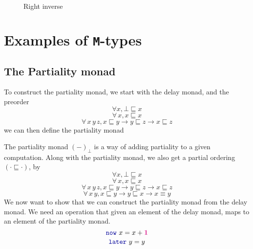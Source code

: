 \documentclass[twoside,11pt,openright]{report}
\theoremstyle{plain} %
\theoremstyle{definition}
\theoremstyle{remark}
\newcommand*{\type}[1]{\textcolor{magenta!90!black}{#1}}
\newcommand*{\unit}{\type{\textbf{1}}}
\newcommand*{\function}[1]{\textcolor{blue!60!black}{\ensuremath{\mathtt{#1}}}}
\begin{document}
\begin{figure}[h]
  \centering
  \caption{Right inverse}
  \label{fig:contractive}
\end{figure}


\chapter{Examples of \texttt{M}-types}

\section{The Partiality monad}
To construct the partiality monad, we start with the delay monad, and the preorder
\begin{equation}
\forall x, \bot \sqsubseteq x
\end{equation}
\begin{equation}
\forall\,x, x \sqsubseteq x
\end{equation}
\begin{equation}
\forall\,x\,y\,z, x \sqsubseteq y \rightarrow y \sqsubseteq z \rightarrow x \sqsubseteq z
\end{equation}
we can then define the partiality monad

The partiality monad \((-)_\bot\) is a way of adding partiality to a given computation. Along with the partiality monad, we also get a partial ordering \((\cdot \sqsubseteq \cdot)\), by
\begin{equation}
\forall x, \bot \sqsubseteq x
\end{equation}
\begin{equation}
\forall\,x, x \sqsubseteq x
\end{equation}
\begin{equation}
\forall\,x\,y\,z, x \sqsubseteq y \rightarrow y \sqsubseteq z \rightarrow x \sqsubseteq z
\end{equation}
\begin{equation}
\forall\,x\,y, x \sqsubseteq y \rightarrow y \sqsubseteq x \rightarrow x \equiv y
\end{equation}
We now want to show that we can construct the partiality monad from the delay monad. We need an operation that given an element of the delay monad, maps to an element of the partiality monad.
\begin{equation}
  \function{now}~x = x + \unit
\end{equation}
\begin{equation}
  \function{later}~y = y
\end{equation}
\end{document}
